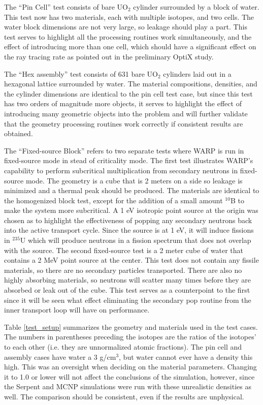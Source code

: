 The ``Pin Cell'' test consists of bare UO$_2$ cylinder surrounded by a block of water.  This test now has two materials, each with multiple isotopes, and two cells.  The water block dimensions are not very large, so leakage should play a part.  This test serves to highlight all the processing routines work simultaneously, and the effect of introducing more than one cell, which should have a significant effect on the ray tracing rate as pointed out in the preliminary OptiX study.

The ``Hex assembly'' test consists of 631 bare UO$_2$ cylinders laid out in a hexagonal lattice surrounded by water.  The material compositions, densities, and the cylinder dimensions are identical to the pin cell test case, but since this test has two orders of magnitude more objects, it serves to highlight the effect of introducing many geometric objects into the problem and will further validate that the geometry processing routines work correctly if consistent results are obtained.

The ``Fixed-source Block'' refers to two separate tests where WARP is run in fixed-source mode in stead of criticality mode. The first test illustrates WARP's capability to perform subcritical multiplication from secondary neutrons in fixed-source mode.  The geometry is a cube that is 2 meters on a side so leakage is minimized and a thermal peak should be produced.  The materials are identical to the homogenized block test, except for the addition of a small amount $^{10}$B to make the system more subcritical.   A 1 eV isotropic point source at the origin was chosen as to highlight the effectiveness of popping any secondary neutrons back into the active transport cycle.  Since the source is at 1 eV, it will induce fissions in $^{235}$U which will produce neutrons in a fission spectrum that does not overlap with the source.  The second fixed-source test is a 2 meter cube of water that contains a 2 MeV point source at the center.  This test does not contain any fissile materials, so there are no secondary particles transported. There are also no highly absorbing materials, so neutrons will scatter many times before they are absorbed or leak out of the cube.  This test serves as a counterpoint to the first since it will be seen what effect eliminating the secondary pop routine from the inner transport loop will have on performance.

Table \ref{test_setup} summarizes the geometry and materials used in the test cases.  The numbers in parentheses preceding the isotopes are the ratios of the  isotopes' to each other (i.e. they are unnormalized atomic fractions).  The pin cell and assembly cases have water a 3 g/cm$^3$, but water cannot ever have a density this high.  This was an oversight when deciding on the material parameters.  Changing it to 1.0 or lower will not affect the conclusions of the simulation, however, since the Serpent and MCNP simulations were run with these unrealistic densities as well.  The comparison should be consistent, even if the results are unphysical.

